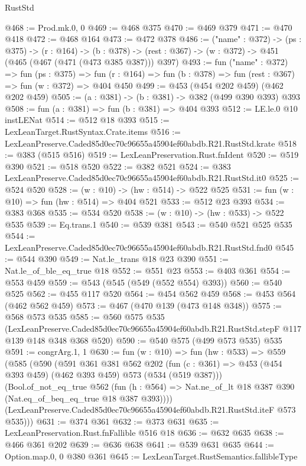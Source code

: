 \begin{lexlean}{RustStd}
\begin{coremodule}
@468 := Prod.mk.{0, 0}
@469 := @468 @375
@470 := @469 @379
@471 := @470 @418
@472 := @468 @164
@473 := @472 @378
@486 := ("name" : @372) ->
  (ps : @375) ->
  (r : @164) ->
  (b : @378) -> (rest : @367) -> (w : @372) -> @451 (@465 (@467 (@471 (@473 @385 @387))) @397)
@493 := fun ("name" : @372) =>
  fun (ps : @375) =>
  fun (r : @164) => fun (b : @378) => fun (rest : @367) => fun (w : @372) => @404 @450
@499 := @453 (@454 @202 @459) (@462 @202 @459)
@505 := (a : @381) -> (b : @381) -> @382 (@499 @390 @393) @393
@508 := fun (a : @381) => fun (b : @381) => @404 @393
@512 := LE.le.{0} @10 instLENat
@514 := @512 @18 @393
@515 := LexLeanTarget.RustSyntax.Crate.items
@516 := LexLeanPreserve.Caded85d0ec70c96655a45904ef60abdb.R21.RustStd.krate
@518 := @383 (@515 @516)
@519 := LexLeanPreservation.Rust.fnIdent
@520 := @519 @390
@521 := @518 @520
@522 := @382 @521
@524 := @383 LexLeanPreserve.Caded85d0ec70c96655a45904ef60abdb.R21.RustStd.it0
@525 := @524 @520
@528 := (w : @10) -> (hw : @514) -> @522 @525
@531 := fun (w : @10) => fun (hw : @514) => @404 @521
@533 := @512 @23 @393
@534 := @383 @368
@535 := @534 @520
@538 := (w : @10) -> (hw : @533) -> @522 @535
@539 := Eq.trans.{1}
@540 := @539 @381
@543 := @540 @521 @525 @535
@544 := LexLeanPreserve.Caded85d0ec70c96655a45904ef60abdb.R21.RustStd.fnd0
@545 := @544 @390
@549 := Nat.le_trans @18 @23 @390
@551 := Nat.le_of_ble_eq_true @18
@552 := @551 @23
@553 := @403 @361
@554 := @553 @459
@559 := @543 (@545 (@549 (@552 @554) @393))
@560 := @540 @525
@562 := @455 @117 @520
@564 := @454 @562 @459
@568 := @453 @564 (@462 @562 @459)
@573 := @467 (@470 @139 (@473 @148 @348))
@575 := @568 @573 @535
@585 := @560
    @575
    @535
    (LexLeanPreserve.Caded85d0ec70c96655a45904ef60abdb.R21.RustStd.stepF
      @117
      @139
      @148
      @348
      @368
      @520)
@590 := @540 @575 (@499 @573 @535) @535
@591 := congrArg.{1, 1}
@630 := fun (w : @10) =>
  fun (hw : @533) =>
  @559
    (@585
      (@590
        (@591
          @361
          @381
          @562
          @202
          (fun (c : @361) => @453 (@454 @393 @459) (@462 @393 @459) @573 (@534 (@519 @387)))
          (Bool.of_not_eq_true
            @562
            (fun (h : @564) => Nat.ne_of_lt @18 @387 @390 (Nat.eq_of_beq_eq_true @18 @387 @393))))
        (LexLeanPreserve.Caded85d0ec70c96655a45904ef60abdb.R21.RustStd.iteF @573 @535)))
@631 := @374 @361
@632 := @373 @631
@635 := LexLeanPreservation.Rust.fnFallible @516 @18
@636 := @632 @635
@638 := @466 @361 @202
@639 := @636 @638
@641 := @539 @631 @635
@644 := Option.map.{0, 0} @380 @361
@645 := LexLeanTarget.RustSemantics.fallibleType

\end{coremodule}
\end{lexlean}
